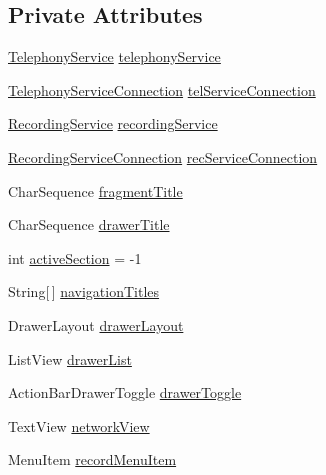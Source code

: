\subsection*{Private Attributes}
\begin{DoxyCompactItemize}
\item 
\hyperlink{classcom_1_1qualoutdoor_1_1recorder_1_1telephony_1_1TelephonyService}{Telephony\-Service} \hyperlink{classcom_1_1qualoutdoor_1_1recorder_1_1MainActivity_afa74ca8ca4d439945c9b72e360004f13}{telephony\-Service}
\item 
\hyperlink{classcom_1_1qualoutdoor_1_1recorder_1_1telephony_1_1TelephonyServiceConnection}{Telephony\-Service\-Connection} \hyperlink{classcom_1_1qualoutdoor_1_1recorder_1_1MainActivity_aee67fc3589f9ffcde9bdc275f9cdbac4}{tel\-Service\-Connection}
\item 
\hyperlink{classcom_1_1qualoutdoor_1_1recorder_1_1recording_1_1RecordingService}{Recording\-Service} \hyperlink{classcom_1_1qualoutdoor_1_1recorder_1_1MainActivity_af38fdbc2c5b036977d4e0c25d817d736}{recording\-Service}
\item 
\hyperlink{classcom_1_1qualoutdoor_1_1recorder_1_1recording_1_1RecordingServiceConnection}{Recording\-Service\-Connection} \hyperlink{classcom_1_1qualoutdoor_1_1recorder_1_1MainActivity_a672740db9e6801d1f94786f3cac1ae7a}{rec\-Service\-Connection}
\item 
Char\-Sequence \hyperlink{classcom_1_1qualoutdoor_1_1recorder_1_1MainActivity_a5959b69046a6d1ca238b4bed45b02d26}{fragment\-Title}
\item 
Char\-Sequence \hyperlink{classcom_1_1qualoutdoor_1_1recorder_1_1MainActivity_a6686ec562cfab0110bd52eddc7e33f54}{drawer\-Title}
\item 
int \hyperlink{classcom_1_1qualoutdoor_1_1recorder_1_1MainActivity_a198488a2b8d8f4d8d9b9f63939fd4dff}{active\-Section} = -\/1
\item 
String\mbox{[}$\,$\mbox{]} \hyperlink{classcom_1_1qualoutdoor_1_1recorder_1_1MainActivity_aebfe9b8493ba8495d570e4aff04aa98f}{navigation\-Titles}
\item 
Drawer\-Layout \hyperlink{classcom_1_1qualoutdoor_1_1recorder_1_1MainActivity_ad37318bd3bb05942c955bc0ccc90935d}{drawer\-Layout}
\item 
List\-View \hyperlink{classcom_1_1qualoutdoor_1_1recorder_1_1MainActivity_ab03934fd9c14fe28a6e5505d41b96cb3}{drawer\-List}
\item 
Action\-Bar\-Drawer\-Toggle \hyperlink{classcom_1_1qualoutdoor_1_1recorder_1_1MainActivity_a6c372005bb6ce12e7204e6e3729b9dab}{drawer\-Toggle}
\item 
Text\-View \hyperlink{classcom_1_1qualoutdoor_1_1recorder_1_1MainActivity_a318bc02d4937447fc88bab0f12a6df64}{network\-View}
\item 
Menu\-Item \hyperlink{classcom_1_1qualoutdoor_1_1recorder_1_1MainActivity_a76c5025a8bcde6c93e3bb320333f5d4a}{record\-Menu\-Item}
\end{DoxyCompactItemize}
